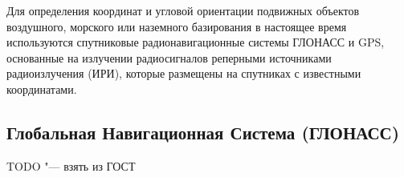 \documentclass[../main.tex]{subfiles}
\begin{document}
Для определения координат и угловой ориентации подвижных объектов воздушного, морского или наземного базирования в настоящее время используются спутниковые радионавигационные системы ГЛОНАСС и GPS, основанные на излучении радиосигналов реперными источниками радиоизлучения (ИРИ), которые размещены на спутниках с известными координатами.

\subsection{Глобальная Навигационная Система (ГЛОНАСС)}
TODO "--- взять из ГОСТ
\end{document}
